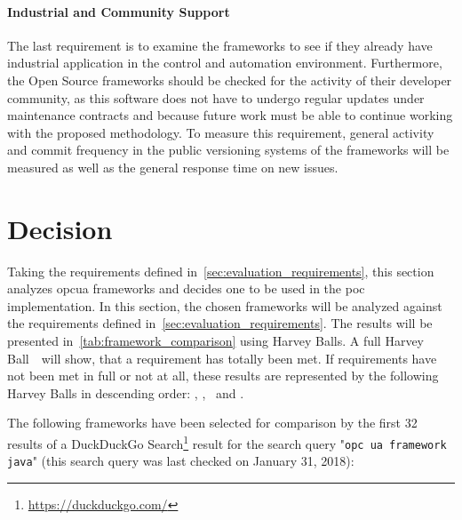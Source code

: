 \documentclass[
a4paper,
twoside,
headsepline,
cleardoublepage=empty,
parskip=half,
draft=false
]{scrbook}
\begin{document}
			\paragraph{Industrial and Community Support} The last requirement is to examine the frameworks to see if they already have industrial application in the control and automation environment.
			Furthermore, the Open Source frameworks should be checked for the activity of their developer community, as this software does not have to undergo regular updates under maintenance contracts and because future work must be able to continue working with the proposed methodology. To measure this requirement, general activity and commit frequency in the public versioning systems of the frameworks will be measured as well as the general response time on new issues.
			
		\section{Decision}\label{sec:evaluation_decision}
		
			Taking the requirements defined in~\cref{sec:evaluation_requirements}, this section analyzes \gls{opcua} frameworks and decides one to be used in the \gls{poc} implementation. In this section, the chosen frameworks will be analyzed against the requirements defined in~\cref{sec:evaluation_requirements}. The results will be presented in~\cref{tab:framework_comparison} using Harvey Balls. 
			A full Harvey Ball~\harveyBallFull~will show, that a requirement has totally been met.
			If requirements have not been met in full or not at all, these results are represented by the following Harvey Balls in descending order: \harveyBallThreeQuarter, \harveyBallHalf, \harveyBallQuarter~and \harveyBallNone.
			
			The following frameworks have been selected for comparison by the first 32 results of a DuckDuckGo Search\footnote{\url{https://duckduckgo.com/}} result for the search query "\texttt{opc ua framework java}" (this search query was last checked on January 31, 2018):
			
\end{document}
